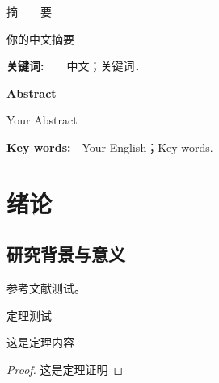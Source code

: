 \documentclass[a4paper,12pt,titlepage]{ctexbook}
\newtheorem{theorem}{\hskip\parindent\bf 定理}[section]
\begin{document}
\newpage
\thispagestyle{empty}%
\mbox{}


\newpage
\setcounter{page}{1}%
\renewcommand{\thepage}{\Roman{page}}%
\begin{center}
	{\heiti 摘~~~~要}\label{cnabs}
\end{center}
\par
\vskip 0.3in
\par

你的中文摘要

\vskip 0.1in
\par
{\heiti\bf 关键词:}~~~~中文；关键词．  

\newpage
{}
\baselineskip 21pt
\begin{center}
{\large\bf Abstract}\label{enabs}
\end{center}
\par
\vskip 0.3in

Your Abstract

\vskip 0.25in
\par
{\heiti\bf Key words:}~~Your English；Key words.

\tableofcontents

\newpage
\markboth{}{}
\mbox{}
\newpage

\setcounter{page}{1}
\renewcommand{\thepage}{\arabic{page}}
\newpage \par 
\newpage \baselineskip 21pt 



\chapter{绪论}

\section{研究背景与意义}

参考文献测试\cite{mathew2008domain}。

定理测试
\begin{theorem}
	这是定理内容
	\begin{proof}
		这是定理证明
	\end{proof}
\end{theorem}
\end{document}
